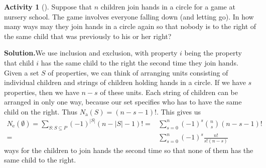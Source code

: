 \documentclass[10pt,]{book}
\theoremstyle{plain}
\theoremstyle{definition}
\newtheorem{activity}[project]{Activity}
\numberwithin{equation}{chapter}
\newcommand{\amp}{&}
\begin{document}
\begin{activity}[]\label{activity-244}
Suppose that \(n\) children join hands in a circle for a game at nursery school. The game involves everyone falling down (and letting go). In how many ways may they join hands in a circle again so that nobody is to the right of the same child that was previously to his or her right?%
\par\medskip\noindent%
\textbf{Solution.}\quad We use inclusion and exclusion, with property \(i\) being the property that child \(i\) has the same child to the right the second time they join hands.  Given a set \(S\) of properties, we can think of arranging units consisting of individual children and strings of children holding hands in a circle. If we have \(s\) properties, then we have \(n-s\) of these units. Each string of children can be arranged in only one way, because our set specifies who has to have the same child on the right. Thus \(N_{\mbox{a} }(S) = (n-s-1)!\). This gives us%
\begin{align*}
N_{\mbox{e} }(\emptyset)=\sum_{S:S\subseteq P}
(-1)^{|S|}(n-|S|-1)! =\amp 
\sum_{s=0}^n (-1)^s \binom{n}{s} (n-s-1)!\\
=\amp \sum_{s=0}^n (-1)^s \frac{n!}{s!(n-s)}
\end{align*}
ways for the children to join hands the second time so that none of them has the same child to the right.%
\end{activity}
\end{document}
